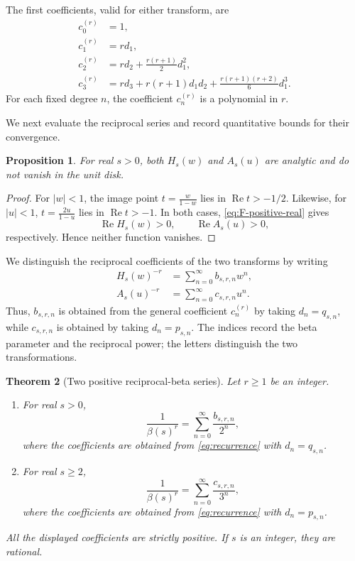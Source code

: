\documentclass[11pt,reqno]{amsart}
\numberwithin{equation}{section}
\newtheorem{theorem}{Theorem}[section]
\newtheorem{proposition}[theorem]{Proposition}
\theoremstyle{definition}
\theoremstyle{remark}
\DeclareMathOperator{\RePart}{Re}
\begin{document}
The first coefficients, valid for either transform, are
\begin{align}
 c_0^{(r)}&=1, \nonumber\\
 c_1^{(r)}&=rd_1, \nonumber\\
 c_2^{(r)}&=rd_2+\frac{r(r+1)}2d_1^2, \label{eq:first-general}\\
 c_3^{(r)}&=rd_3+r(r+1)d_1d_2
   +\frac{r(r+1)(r+2)}6d_1^3. \nonumber
\end{align}
For each fixed degree \(n\), the coefficient \(c_n^{(r)}\) is a
polynomial in \(r\).

We next evaluate the reciprocal series and record quantitative bounds
for their convergence.

\begin{proposition}\label{prop:zero-free}
For real \(s>0\), both \(H_s(w)\) and \(A_s(u)\) are analytic and do not vanish in the unit disk.
\end{proposition}

\begin{proof}
For \(|w|<1\), the image point
\(
 t=\frac{w}{1-w}
\)
lies in \(\RePart t>-1/2\).  Likewise, for \(|u|<1\),
\(
 t=\frac{2u}{1-u}
\)
lies in \(\RePart t>-1\).  In both cases, \eqref{eq:F-positive-real} gives
\[
 \RePart H_s(w)>0,\qquad
 \RePart A_s(u)>0,
\]
respectively.  Hence neither function vanishes.
\end{proof}

We distinguish the reciprocal coefficients of the two transforms by
writing
\begin{align}
 H_s(w)^{-r}
 &=\sum_{n=0}^{\infty}b_{s,r,n}w^n, \label{eq:b-definition}\\
 A_s(u)^{-r}
 &=\sum_{n=0}^{\infty}c_{s,r,n}u^n. \label{eq:c-definition}
\end{align}
Thus, \(b_{s,r,n}\) is obtained from the general coefficient
\(c_n^{(r)}\) by taking \(d_n=q_{s,n}\), while \(c_{s,r,n}\) is
obtained by taking \(d_n=p_{s,n}\).  The indices record the beta parameter and the
reciprocal power; the letters distinguish the two transformations.

\begin{theorem}[Two positive reciprocal-beta series]
\label{thm:main-two-series}
Let \(r\geq1\) be an integer.
\begin{enumerate}[label=(\alph*)]
 \item For real \(s>0\),
 \begin{equation}\label{eq:beta-base2}
  \frac1{\beta(s)^r}
  =\sum_{n=0}^{\infty}\frac{b_{s,r,n}}{2^n},
 \end{equation}
 where the coefficients are obtained from
 \eqref{eq:recurrence} with \(d_n=q_{s,n}\).
 \item For real \(s\geq2\),
 \begin{equation}\label{eq:beta-base3}
  \frac1{\beta(s)^r}
  =\sum_{n=0}^{\infty}\frac{c_{s,r,n}}{3^n},
 \end{equation}
 where the coefficients are obtained from
 \eqref{eq:recurrence} with \(d_n=p_{s,n}\).
\end{enumerate}
All the displayed coefficients are strictly positive.  If \(s\) is
an integer, they are rational.
\end{theorem}
\end{document}
